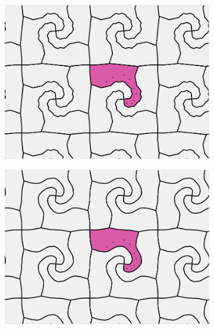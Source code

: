 \documentclass[12pt]{report}
\begin{document}
\begin{figure}[h]
\begin{subfigure}[b]{0.323\textwidth}
  \end{subfigure}

\quad


  \begin{subfigure}[b]{0.5\textwidth}
    \includegraphics[width=.9\textwidth]{s5.png}

  
  \end{subfigure}
  \begin{subfigure}[b]{0.5\textwidth}
    \includegraphics[width=.9\textwidth]{s6.png}

  \end{subfigure}
  
\end{figure}
\end{document}
